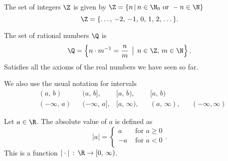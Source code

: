 \documentclass[10pt, a4paper]{article}
\begin{document}
\begin{definition}
    The set of integers $\Z$ is given by $\Z = \{n\, |\, n \in \N_0 \text{ or } -n \in \N\}$
    \[
    \Z = \{\dotsc,\,-2,\,-1,\,0,\,1,\,2,\,\dotsc\}.
    \]
\end{definition}

\begin{definition}
    The set of rational numbers $\Q$ is
    \[
    \Q = \left\{n \cdot m ^ {-1} = \frac{n}{m}\,\bigm\lvert\, n \in \Z,\, m \in \N\right\}.
    \]
    Satisfies all the axioms of the real numbers we have seen so far. 
\end{definition}

We also use the usual notation for intervals
\begin{align*}
    &(a,\,b) & &(a,\, b], &[a,\,b), & &[a,\, b) \\
    &(-\infty,\,a) & &(-\infty,\, a], &[a,\,\infty), & &(a,\, \infty), & &(-\infty, \infty)
\end{align*}

\begin{definition}
    Let $a \in \R$. The absolute value of $a$ is defined as
    \[
    |a| = \begin{cases}
        a &\text{ for } a \geq 0 \\ 
        -a &\text{ for } a < 0 \\ 
    \end{cases}.
    \]
    This is a function $|\cdot|\,:\, \R \to [0,\,\infty)$.
\end{definition}
\end{document}
